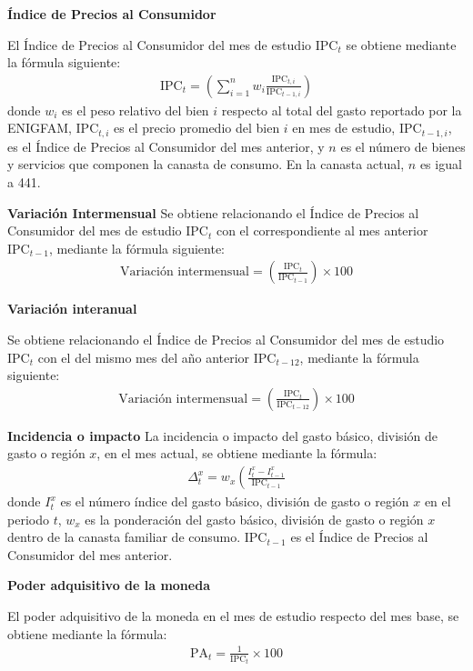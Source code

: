 \newcommand{\IPC}[1]{\text{IPC}_{#1}}
\textbf{Índice de Precios al Consumidor}

El Índice de Precios al Consumidor del mes de estudio $\IPC{t}$ se obtiene mediante la fórmula siguiente:
\begin{align*}
	\IPC{t} = \left(\sum_{i=1}^{n} w_i \frac{\IPC{t,i}}{\IPC{t-1,i}} \right)
\end{align*}
donde $w_i$ es el peso relativo del bien $i$ respecto al total del gasto reportado por la ENIGFAM, $\IPC{t,i}$ es el precio promedio del bien $i$ en mes de estudio, $\IPC{t-1,i}$, es el Índice de Precios al Consumidor del mes anterior, y $n$ es el número de bienes y servicios que componen la canasta de consumo. En la canasta actual, $n$ es igual a 441.

\textbf{Variación Intermensual}
Se obtiene relacionando el Índice de Precios al Consumidor del mes de estudio $\IPC{t}$ con el correspondiente al mes anterior $\IPC{t-1}$, mediante la fórmula siguiente:
\begin{align*}
	\text{Variación intermensual} = \left( \frac{\IPC{t}}{\IPC{t-1}} \right) \times 100
\end{align*}

\textbf{Variación interanual}

Se obtiene relacionando el Índice de Precios al Consumidor del mes de estudio $\IPC{t}$ con el del mismo mes del año anterior $\IPC{t-12}$, mediante la fórmula siguiente:
\begin{align*}
	\text{Variación intermensual} = \left( \frac{\IPC{t}}{\IPC{t-12}} \right) \times 100
\end{align*}

\textbf{Incidencia o impacto}
La incidencia o impacto del gasto básico, división de gasto o región $x$, en el mes actual, se obtiene mediante la fórmula:
\begin{align*}
	\Delta_{t}^{x} = w_x \left( \frac{I_t^x - I_{t-1}^x}{\IPC{t-1}}
\end{align*}
donde $I_t^x$ es el número índice del gasto básico, división de gasto o región $x$ en el periodo $t$, $w_x$ es la ponderación del gasto básico, división de gasto o región $x$ dentro de la canasta familiar de consumo. $\IPC{t-1}$ es el Índice de Precios al Consumidor del mes anterior.

\textbf{Poder adquisitivo de la moneda}

El poder adquisitivo de la moneda en el mes de estudio respecto del mes base, se obtiene mediante la fórmula:
\begin{align*}
	\text{PA}_t = \frac{1}{\IPC{t}} \times 100
\end{align*}